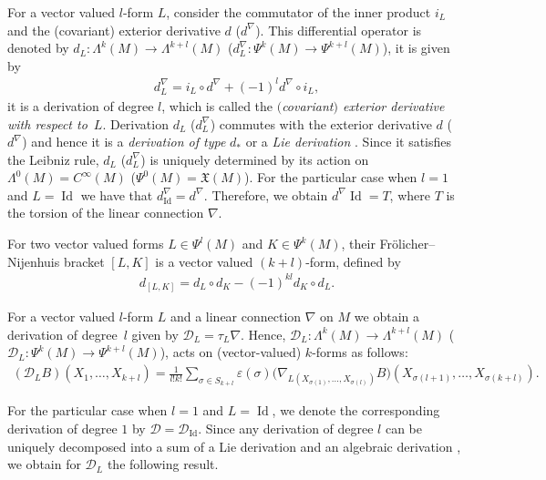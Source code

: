 \documentclass[pdftex]{sigma}
\numberwithin{equation}{section}
\begin{document}
For a vector valued $l$-form $L$, consider the commutator of the inner
product $i_L$ and the (covariant) exterior derivative $d$
($d^{\nabla}$). This dif\/ferential operator is
denoted by  $d_L: \Lambda^k(M) \to \Lambda^{k+l}(M)$ ($d^{\nabla}_L:
\Psi^k(M) \to \Psi^{k+l}(M)$), it is given by
\begin{gather} d^{\nabla}_L=i_L\circ d^{\nabla}+(-1)^{l}d^{\nabla}\circ i_L,
\label{dil}
\end{gather} it is a derivation of degree $l$, which is
called the \emph{$($covariant$)$ exterior derivative with respect to}~$L$. Derivation $d_L$ ($d^{\nabla}_L$) commutes with the exterior
derivative $d$ ($d^{\nabla}$) and hence it is a \emph{derivation of type}
$d_*$ \cite{grifone00} or a \emph{Lie derivation} \cite{KMS93}.
Since it satisf\/ies the Leibniz rule, $d_L$ ($d_{L}^{\nabla}$) is
uniquely determined by its action on $\Lambda^0(M)=C^{\infty}(M)$
($\Psi^0(M)={\mathfrak X}(M)$). For the particular case when $l=1$ and
$L=\operatorname{Id}$ we have that
$d^{\nabla}_{\operatorname{Id}}=d^{\nabla}$. Therefore, we obtain
$d^{\nabla}\operatorname{Id}=T$, where $T$ is the torsion of the linear
connection $\nabla$.

For two vector valued forms $L\in \Psi^l(M)$ and $K\in \Psi^k(M)$,
their Fr\"olicher--Nijenhuis bracket $[L,K]$ is a vector
valued $(k+l)$-form, def\/ined by
\begin{gather} \label{dlk}
d_{[L,K]}=d_L\circ d_K -(-1)^{kl}d_K\circ d_L.
\end{gather}

For a vector valued $l$-form $L$ and a linear connection $\nabla$
on $M$ we obtain a derivation of degree~$l$ given by ${\mathcal
D}_L=\tau_L \nabla$. Hence, ${\mathcal D}_L: \Lambda^k(M) \to
\Lambda^{k+l}(M)$ (${\mathcal D}_L: \Psi^k(M) \to
\Psi^{k+l}(M)$), acts on (vector-valued) $k$-forms as follows:
\begin{gather} \left({\mathcal
D_L}B\right)(X_1,\dots ,X_{k+l})  = \frac{1}{l!k!}
\sum_{\sigma\in S_{k+l}}
\varepsilon(\sigma)\big(\nabla_{L(X_{\sigma(1)},\dots ,X_{\sigma(l)})}B\big)\left(X_{\sigma(l+1)},\dots ,
X_{\sigma(k+l)}\right). \label{DLlk}
\end{gather}

For the particular case when $l=1$ and $L=\operatorname{Id}$, we
denote the corresponding derivation of degree $1$ by $\mathcal{D} =
\mathcal{D}_{\operatorname{Id}}$.
Since any derivation of degree $l$ can be uniquely
decomposed into a sum of a Lie derivation and an algebraic
derivation \cite[\S~8.3]{KMS93}, we obtain for ${\mathcal D}_L$
the following result.
\end{document}
